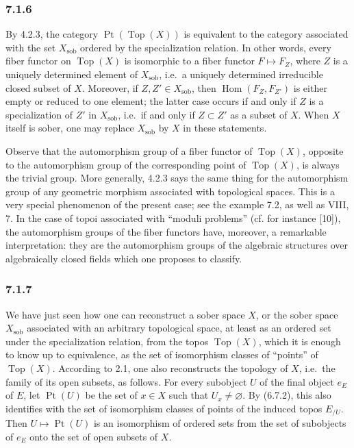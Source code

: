 \documentclass[11pt]{article}
\newcommand{\Top}{\operatorname{Top}}
\newcommand{\Hom}{\operatorname{Hom}}
\newcommand{\Ppoint}{\operatorname{Pt}}
\newcommand{\sob}{\operatorname{sob}}
\newcommand{\ie}{i.e.}
\providecommand{\Pt}{\operatorname{Pt}}
\begin{document}
\subsubsection*{7.1.6}
By 4.2.3, the category \(\Ppoint(\Top(X))\) is equivalent to the category associated with the set \(X_{\sob}\) ordered by the specialization relation. In other words, every fiber functor on \(\Top(X)\) is isomorphic to a fiber functor \(F\mapsto F_Z\), where \(Z\) is a uniquely determined element of \(X_{\sob}\), \ie\ a uniquely determined irreducible closed subset of \(X\). Moreover, if \(Z,Z'\in X_{\sob}\), then \(\Hom(F_Z,F_{Z'})\) is either empty or reduced to one element; the latter case occurs if and only if \(Z\) is a specialization of \(Z'\) in \(X_{\sob}\), \ie\ if and only if \(Z\subset Z'\) as a subset of \(X\). When \(X\) itself is sober, one may replace \(X_{\sob}\) by \(X\) in these statements.

Observe that the automorphism group of a fiber functor of \(\Top(X)\), opposite to the automorphism group of the corresponding point of \(\Top(X)\), is always the trivial group. More generally, 4.2.3 says the same thing for the automorphism group of any geometric morphism associated with topological spaces. This is a very special phenomenon of the present case; see the example 7.2, as well as VIII, 7. In the case of topoi associated with ``moduli problems'' (cf. for instance [10]), the automorphism groups of the fiber functors have, moreover, a remarkable interpretation: they are the automorphism groups of the algebraic structures over algebraically closed fields which one proposes to classify.

\subsubsection*{7.1.7}
We have just seen how one can reconstruct a sober space \(X\), or the sober space \(X_{\sob}\) associated with an arbitrary topological space, at least as an ordered set under the specialization relation, from the topos \(\Top(X)\), which it is enough to know up to equivalence, as the set of isomorphism classes of ``points'' of \(\Top(X)\). According to 2.1, one also reconstructs the topology of \(X\), \ie\ the family of its open subsets, as follows. For every subobject \(U\) of the final object \(e_E\) of \(E\), let \(\Pt(U)\) be the set of \(x\in X\) such that \(U_x\ne\varnothing\). By (6.7.2), this also identifies with the set of isomorphism classes of points of the induced topos \(E_{/U}\). Then \(U\mapsto\Pt(U)\) is an isomorphism of ordered sets from the set of subobjects of \(e_E\) onto the set of open subsets of \(X\).
\end{document}
